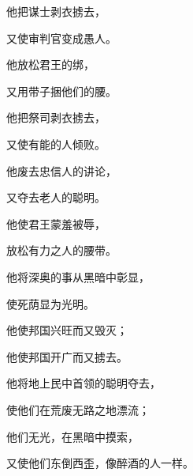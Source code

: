 {\par }{\Q {}他把谋士剥衣掳去，
\par }{\Q 又使审判官变成愚人。
\par }{\Q {}他放松君王的绑，
\par }{\Q 又用带子捆他们的腰。
\par }{\Q {}他把祭司剥衣掳去，
\par }{\Q 又使有能的人倾败。
\par }{\Q {}他废去忠信人的讲论，
\par }{\Q 又夺去老人的聪明。
\par }{\Q {}他使君王蒙羞被辱，
\par }{\Q 放松有力之人的腰带。
\par }{\Q {}他将深奥的事从黑暗中彰显，
\par }{\Q 使死荫显为光明。
\par }{\Q {}他使邦国兴旺而又毁灭；
\par }{\Q 他使邦国开广而又掳去。
\par }{\Q {}他将地上民中首领的聪明夺去，
\par }{\Q 使他们在荒废无路之地漂流；
\par }{\Q {}他们无光，在黑暗中摸索，
\par }{\Q 又使他们东倒西歪，像醉酒的人一样。

}
